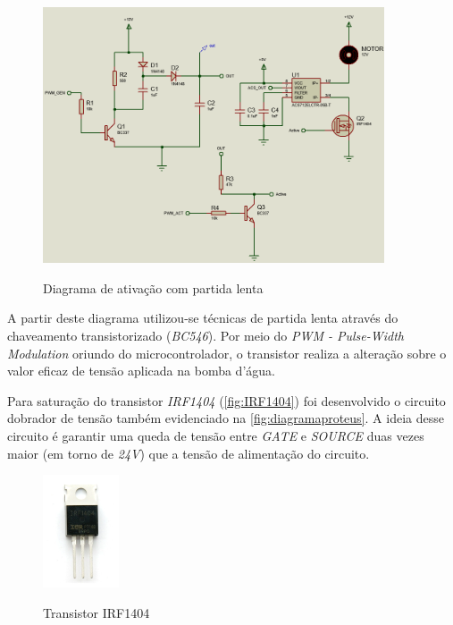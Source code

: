 \begin{figure}[H]
	\centering
	\caption{Diagrama de ativação com partida lenta}
	\includegraphics[width=0.9\textwidth]{figuras/diagrama_ativação_bomba.png}
	\label{fig:diagramaproteus}
\end{figure} 

A partir deste diagrama utilizou-se técnicas de partida lenta através do chaveamento transistorizado (\textit{BC546}). Por meio do \textit{PWM - Pulse-Width Modulation} oriundo do microcontrolador, o transistor realiza a alteração sobre o valor eficaz de tensão aplicada na bomba d'água.

Para saturação do transistor \textit{IRF1404} (\autoref{fig:IRF1404}) foi desenvolvido o circuito dobrador de tensão também evidenciado na \autoref{fig:diagramaproteus}. A ideia desse circuito é garantir uma queda de tensão entre \textit{GATE} e \textit{SOURCE} duas vezes maior (em torno de \textit{24V}) que a tensão de alimentação do circuito.

\begin{figure}[H]
	\centering
	\caption{Transistor IRF1404}
	\includegraphics[width=0.2\textwidth]{figuras/IRF1404.png}
	\label{fig:IRF1404}
\end{figure} 

